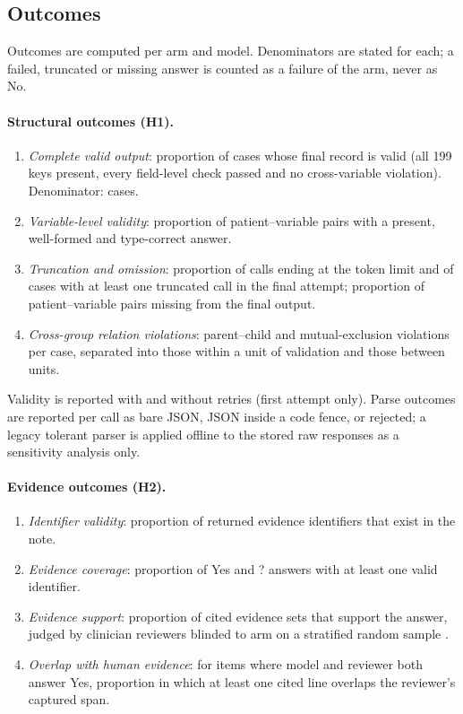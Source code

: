 \subsection{Outcomes}\label{sec:outcomes}

Outcomes are computed per arm and model. Denominators are stated for each; a failed, truncated or
missing answer is counted as a failure of the arm, never as No.

\paragraph{Structural outcomes (H1).}
\begin{enumerate}
\item \emph{Complete valid output}: proportion of cases whose final record is valid (all 199 keys
present, every field-level check passed and no cross-variable violation). Denominator: cases.
\item \emph{Variable-level validity}: proportion of patient--variable pairs with a present, well-formed
and type-correct answer.
\item \emph{Truncation and omission}: proportion of calls ending at the token limit and of cases with at
least one truncated call in the final attempt; proportion of patient--variable pairs missing from the final
output.
\item \emph{Cross-group relation violations}: parent--child and mutual-exclusion violations per case,
separated into those within a unit of validation and those between units.
\end{enumerate}
Validity is reported with and without retries (first attempt only). Parse outcomes are reported per call
as bare JSON, JSON inside a code fence, or rejected; a legacy tolerant parser is applied offline to the
stored raw responses as a sensitivity analysis only.

\paragraph{Evidence outcomes (H2).}
\begin{enumerate}
\item \emph{Identifier validity}: proportion of returned evidence identifiers that exist in the note.
\item \emph{Evidence coverage}: proportion of Yes and ? answers with at least one valid identifier.
\item \emph{Evidence support}: proportion of cited evidence sets that support the answer, judged by
clinician reviewers blinded to arm on a stratified random sample .
\item \emph{Overlap with human evidence}: for items where model and reviewer both answer Yes, proportion
in which at least one cited line overlaps the reviewer's captured span.
\end{enumerate}

